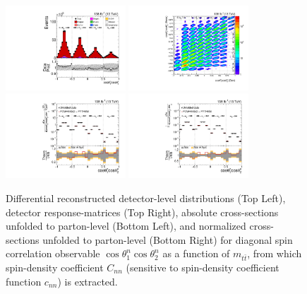 \clearpage
\begin{figure}[htb]
\begin{center}
 \includegraphics[width=0.40\textwidth]{fig_fullRun2UL/controlplots/combined/Hyp_LLBarCnn_vs_TTBarMass.pdf}
 \includegraphics[width=0.40\textwidth]{fig_fullRun2UL/unfolding/combined/ResponseMatrix_c_nn_mttbar.pdf} \\
 \includegraphics[width=0.40\textwidth]{fig_fullRun2UL/unfolding/combined/UnfoldedResults_c_nn_mttbar.pdf}
 \includegraphics[width=0.40\textwidth]{fig_fullRun2UL/unfolding/combined/UnfoldedResultsNorm_c_nn_mttbar.pdf} \\
\label{fig:c_nn_mttbar}
\caption{Differential reconstructed detector-level distributions (Top Left), detector response-matrices (Top Right), absolute cross-sections unfolded to parton-level (Bottom Left), and normalized cross-sections unfolded to parton-level (Bottom Right) for diagonal spin correlation observable $\cos\theta_{1}^{n}\cos\theta_{2}^{n}$ as a function of $m_{t\bar{t}}$, from which spin-density coefficient $C_{nn}$ (sensitive to spin-density coefficient function $c_{n n}$) is extracted.}
\end{center}
\end{figure}
